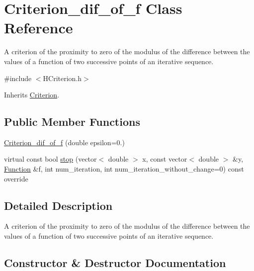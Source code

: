\hypertarget{class_criterion__dif__of__f}{}\section{Criterion\+\_\+dif\+\_\+of\+\_\+f Class Reference}
\label{class_criterion__dif__of__f}


A criterion of the proximity to zero of the modulus of the difference between the values of a function of two successive points of an iterative sequence.  




{\ttfamily \#include $<$H\+Criterion.\+h$>$}



Inherits \hyperlink{class_criterion}{Criterion}.

\subsection*{Public Member Functions}
\begin{DoxyCompactItemize}
\item 
\hyperlink{class_criterion__dif__of__f_abba5258a6673dfd2682b4f1ce9ffb96b}{Criterion\+\_\+dif\+\_\+of\+\_\+f} (double epsilon=0.)
\item 
virtual const bool \hyperlink{class_criterion__dif__of__f_a0bea2c48766a1db63ec9d3ba7cf08767}{stop} (vector$<$ double $>$ x, const vector$<$ double $>$ \&y, \hyperlink{class_function}{Function} \&f, int num\+\_\+iteration, int num\+\_\+iteration\+\_\+without\+\_\+change=0) const override
\end{DoxyCompactItemize}


\subsection{Detailed Description}
A criterion of the proximity to zero of the modulus of the difference between the values of a function of two successive points of an iterative sequence. 

\subsection{Constructor \& Destructor Documentation}
\mbox{\label{class_criterion__dif__of__f_abba5258a6673dfd2682b4f1ce9ffb96b}} 
